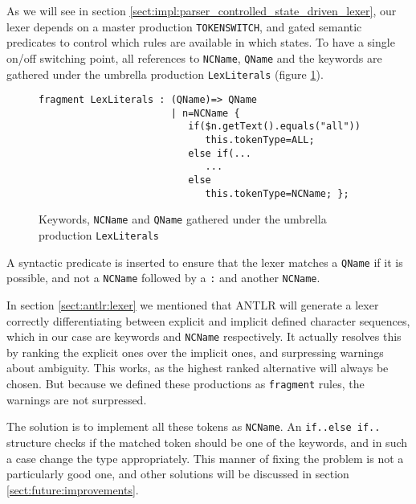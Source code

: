 As we will see in section \ref{sect:impl:parser_controlled_state_driven_lexer}, our lexer depends on a master production \verb!TOKENSWITCH!, and gated semantic predicates to control which rules are available in which states. To have a single on/off switching point, all references to \verb!NCName!, \verb!QName! and the keywords are gathered under the umbrella production \verb!LexLiterals! (figure \ref{fig:lexLitterals}).

\begin{figure}[h!]
\begin{Verbatim}
fragment LexLiterals : (QName)=> QName
                       | n=NCName {
                          if($n.getText().equals("all")) 
                             this.tokenType=ALL;
                          else if(...
                             ...
                          else 
                             this.tokenType=NCName; };
\end{Verbatim}
\caption[Keywords, \texttt{NCName} and \texttt{QName} gathered under \texttt{LexLiterals}]{Keywords, \texttt{NCName} and \texttt{QName} gathered under the umbrella production \texttt{LexLiterals}}
\label{fig:lexLitterals}
\end{figure}

A syntactic predicate is inserted to ensure that the lexer matches a \verb!QName! if it is possible, and not a \verb!NCName! followed by a \verb!:! and another \verb!NCName!.

In section \ref{sect:antlr:lexer} we mentioned that ANTLR will generate a lexer correctly differentiating between explicit and implicit defined character sequences, which in our case are keywords and \verb!NCName! respectively. It actually resolves this by ranking the explicit ones over the implicit ones, and surpressing warnings about ambiguity. This works, as the highest ranked alternative will always be chosen. But because we defined these productions as \verb!fragment! rules, the warnings are not surpressed.

The solution is to implement all these tokens as \verb!NCName!. An \verb!if..else if..! structure checks if the matched token should be one of the keywords, and in such a case change the type appropriately. This manner of fixing the problem is not a particularly good one, and other solutions will be discussed in section \ref{sect:future:improvements}.
